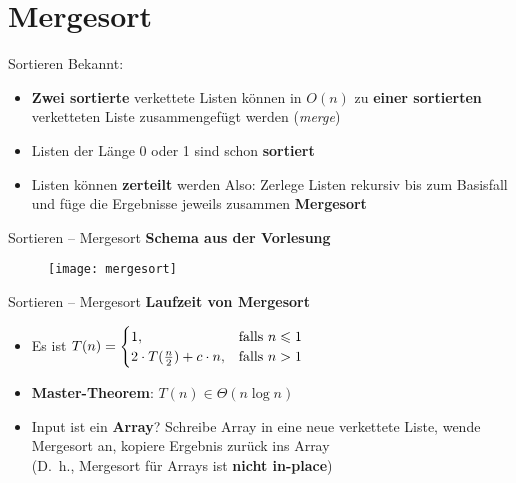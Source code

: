 \section{Mergesort}
\begin{frame}{{Sortieren}}
	Bekannt:   %
	\begin{itemize}
		\item \textbf{Zwei sortierte} verkettete Listen können in $O(n)$ zu \textbf{einer sortierten} verketteten Liste zusammengefügt werden (\emph{merge})
		\pause
		\item Listen der Länge 0 oder 1 sind schon \textbf{sortiert}
		\pause
		\item Listen können \textbf{zerteilt} werden
		\pause
		\implitem Also: Zerlege Listen rekursiv bis zum Basisfall und füge die Ergebnisse jeweils zusammen \impl \textbf{Mergesort} 
		\begin{algorithm}[H]
		\end{algorithm}
	\end{itemize}
\end{frame}

\begin{frame}{Sortieren – Mergesort}
	\textbf{Schema aus der Vorlesung}
	\begin{figure}[htp]
		\centering
		\texttt{[image: mergesort]}
	\end{figure}
\end{frame}


\begin{frame}{Sortieren – Mergesort}
	\textbf{Laufzeit von Mergesort}
	\pause
	\begin{itemize}
		\item Es ist $T(n) = \begin{cases}
			1, & \text{falls } n \leq 1 \\
			2 \cdot T(\fract n/2 ) + c \cdot n, & \text{falls } n > 1
		\end{cases}$
		\pause
		\item \textbf{Master-Theorem}: \quad $T(n) \in \Theta(n \log n)$
		\pause
		\item Input ist ein \textbf{Array}? \impl  Schreibe Array in eine neue verkettete Liste, wende Mergesort an, kopiere Ergebnis zurück ins Array \\
		(\impl D.~h., Mergesort für Arrays ist \textbf{nicht in-place})
	\end{itemize}
\end{frame}

